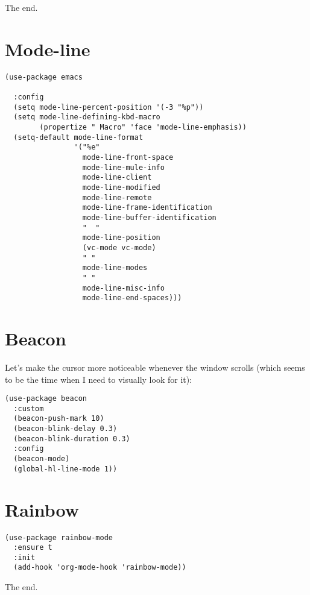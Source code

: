 \documentclass[12pt]{article}
\begin{document}
The end.

\section{Mode-line}
\label{sec:org0396420}

\begin{verbatim}
(use-package emacs

  :config
  (setq mode-line-percent-position '(-3 "%p"))
  (setq mode-line-defining-kbd-macro
        (propertize " Macro" 'face 'mode-line-emphasis))
  (setq-default mode-line-format
                '("%e"
                  mode-line-front-space
                  mode-line-mule-info
                  mode-line-client
                  mode-line-modified
                  mode-line-remote
                  mode-line-frame-identification
                  mode-line-buffer-identification
                  "  "
                  mode-line-position
                  (vc-mode vc-mode)
                  " "
                  mode-line-modes
                  " "
                  mode-line-misc-info
                  mode-line-end-spaces)))
\end{verbatim}

\section{Beacon}
\label{sec:org9d754b5}
Let's make the cursor more noticeable whenever the window scrolls
(which seems to be the time when I need to visually look for it):

\begin{verbatim}
(use-package beacon
  :custom
  (beacon-push-mark 10)
  (beacon-blink-delay 0.3)
  (beacon-blink-duration 0.3)
  :config
  (beacon-mode)
  (global-hl-line-mode 1))

\end{verbatim}

\section{Rainbow}
\label{sec:orgd7e2ff9}

\begin{verbatim}
(use-package rainbow-mode
  :ensure t
  :init
  (add-hook 'org-mode-hook 'rainbow-mode))
\end{verbatim}
The end.
\end{document}
